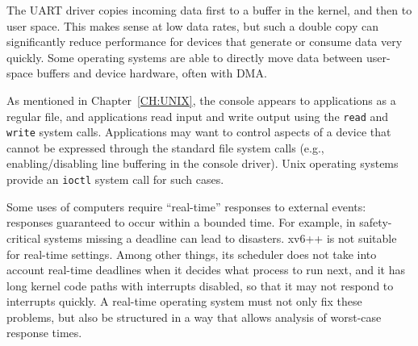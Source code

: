 The UART driver copies incoming data first to a buffer in the kernel,
and then to user space. This makes sense at low data rates, but such a
double copy can significantly reduce performance for devices that
generate or consume data very quickly. Some operating systems are able
to directly move data between user-space buffers and device hardware,
often with DMA.

As mentioned in Chapter~\ref{CH:UNIX}, the console appears to
applications as a regular file, and applications read input and write
output using the \lstinline{read} and \lstinline{write} system calls.
Applications may want to control aspects of a device that cannot be
expressed through the standard file system calls (e.g.,
enabling/disabling line buffering in the console driver).  Unix
operating systems provide an \lstinline{ioctl} system call for such
cases.

Some uses of computers require ``real-time'' responses to external
events: responses guaranteed to occur within a bounded time. For
example, in safety-critical systems missing a deadline can lead to
disasters. xv6++ is not suitable for real-time settings. Among other
things, its scheduler does not take into account real-time deadlines
when it decides what process to run next, and it has long kernel code
paths with interrupts disabled, so that it may not respond to
interrupts quickly. A real-time operating system must not only fix
these problems, but also be structured in a way that allows analysis
of worst-case response times.
